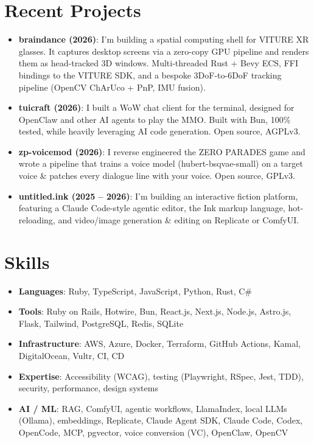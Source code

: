 \documentclass[11pt]{article}
\newcommand{\resumeItem}[2]{
\item\small{
    \textbf{#1}{: #2 \vspace{-2pt}}
  }
}
\newcommand{\resumeSubHeadingListStart}{
\begin{itemize}[leftmargin=*, topsep=0pt, itemsep=6pt, parsep=0pt]}
\newcommand{\resumeSubHeadingListEnd}{
\end{itemize}}
\begin{document}
\section{Recent Projects}
\resumeSubHeadingListStart


\resumeItem{braindance (2026)}
{I'm building a spatial computing shell for VITURE XR glasses. It captures
desktop screens via a zero-copy GPU pipeline and renders them as head-tracked 3D
windows. Multi-threaded Rust + Bevy ECS, FFI bindings to the VITURE SDK, and a
bespoke 3DoF-to-6DoF tracking pipeline (OpenCV ChArUco + PnP, IMU fusion).}

\resumeItem{tuicraft (2026)}
{I built a WoW chat client for the terminal, designed for OpenClaw and other AI
agents to play the MMO. Built with Bun, 100\% tested, while heavily leveraging
AI code generation. Open source, AGPLv3.}

\resumeItem{zp-voicemod (2026)}
{I reverse engineered the ZERO PARADES game and wrote a pipeline that trains a
voice model (hubert-bsqvae-small) on a target voice \& patches every dialogue
line with your voice. Open source, GPLv3.}

\resumeItem{untitled.ink (2025 -- 2026)}
{I'm building an interactive fiction platform, featuring a Claude Code-style
agentic editor, the Ink markup language, hot-reloading, and video/image
generation \& editing on Replicate or ComfyUI.}

\resumeSubHeadingListEnd

\section{Skills}
\resumeSubHeadingListStart

\resumeItem{Languages}
{Ruby, TypeScript, JavaScript, Python, Rust, C\#}

\resumeItem{Tools}
{Ruby on Rails, Hotwire, Bun, React.js, Next.js, Node.js, Astro.js, Flask,
Tailwind, PostgreSQL, Redis, SQLite}

\resumeItem{Infrastructure}
{AWS, Azure, Docker, Terraform, GitHub Actions, Kamal, DigitalOcean, Vultr, CI,
CD}

\resumeItem{Expertise}
{Accessibility (WCAG), testing (Playwright, RSpec, Jest, TDD), security,
performance, design systems}

\resumeItem{AI / ML}
{RAG, ComfyUI, agentic workflows, LlamaIndex, local LLMs (Ollama), embeddings,
Replicate, Claude Agent SDK, Claude Code, Codex, OpenCode, MCP, pgvector, voice
conversion (VC), OpenClaw, OpenCV}

\resumeSubHeadingListEnd
\end{document}
